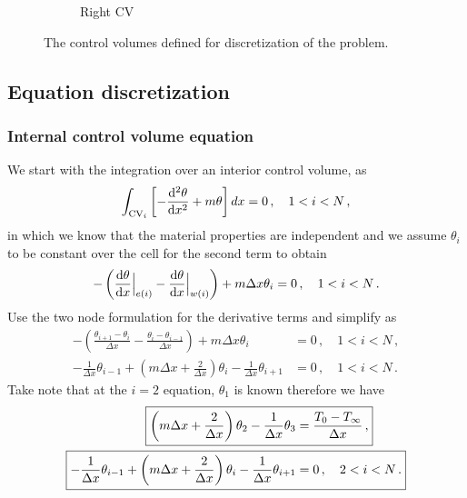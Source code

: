 \documentclass{article}
\begin{document}
\begin{figure}[H]
\begin{subfigure}[t]{0.32\textwidth}
		\caption{Right CV}
	\end{subfigure}
	\caption{The control volumes defined for discretization of the problem.}
	\label{fig:CVs}
\end{figure}

\subsection*{Equation discretization}

\subsubsection*{Internal control volume equation}

We start with the integration over an interior control volume, as
\[
	\int_{\text{CV}_i} \left[ -\dv{^2\theta}{x^2} + m \theta \right] dx = 0\,, \quad 1 < i < N\,,
\]
in which we know that the material properties are independent and we assume $\theta_i$ to be constant over the cell for the second term to obtain
\[
	- \left( \dv{\theta}{x}\Big|_{e(i)} - \dv{\theta}{x}\Big|_{w(i)} \right) + m \Delta x \theta_i = 0\,, \quad 1 < i < N\,.
\]
Use the two node formulation for the derivative terms and simplify as
\begin{align*}
	- \left( \frac{\theta_{i+1} - \theta_i}{\Delta x} - \frac{\theta_i - \theta_{i - 1}}{\Delta x} \right) + m \Delta x \theta_i & = 0 \,, \quad 1 < i < N\,, \\
	- \frac{1}{\Delta x} \theta_{i-1} + \left(m \Delta x + \frac{2}{\Delta x}\right) \theta_i - \frac{1}{\Delta x} \theta_{i+1} & = 0\,, \quad 1 < i < N\,.
\end{align*}
Take note that at the $i = 2$ equation, $\theta_1$ is known therefore we have
\begin{align}
	\Aboxed{\left(m \Delta x + \frac{2}{\Delta x}\right) \theta_2 - \frac{1}{\Delta x} \theta_3 & = \frac{T_0 - T_\infty}{\Delta x}\,,}\\
	\Aboxed{- \frac{1}{\Delta x} \theta_{i-1} + \left(m \Delta x + \frac{2}{\Delta x}\right) \theta_i - \frac{1}{\Delta x} \theta_{i+1} & = 0\,, \quad 2 < i < N\,.}
\end{align}
\end{document}

